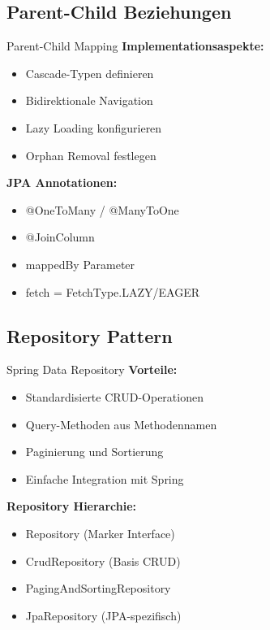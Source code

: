 \subsection{Parent-Child Beziehungen}

\begin{concept}{Parent-Child Mapping}
\textbf{Implementationsaspekte:}
\begin{itemize}
    \item Cascade-Typen definieren
    \item Bidirektionale Navigation
    \item Lazy Loading konfigurieren
    \item Orphan Removal festlegen
\end{itemize}

\textbf{JPA Annotationen:}
\begin{itemize}
    \item @OneToMany / @ManyToOne
    \item @JoinColumn
    \item mappedBy Parameter
    \item fetch = FetchType.LAZY/EAGER
\end{itemize}
\end{concept}

\subsection{Repository Pattern}

\begin{concept}{Spring Data Repository}
\textbf{Vorteile:}
\begin{itemize}
    \item Standardisierte CRUD-Operationen
    \item Query-Methoden aus Methodennamen
    \item Paginierung und Sortierung
    \item Einfache Integration mit Spring
\end{itemize}

\textbf{Repository Hierarchie:}
\begin{itemize}
    \item Repository (Marker Interface)
    \item CrudRepository (Basis CRUD)
    \item PagingAndSortingRepository
    \item JpaRepository (JPA-spezifisch)
\end{itemize}
\end{concept}

